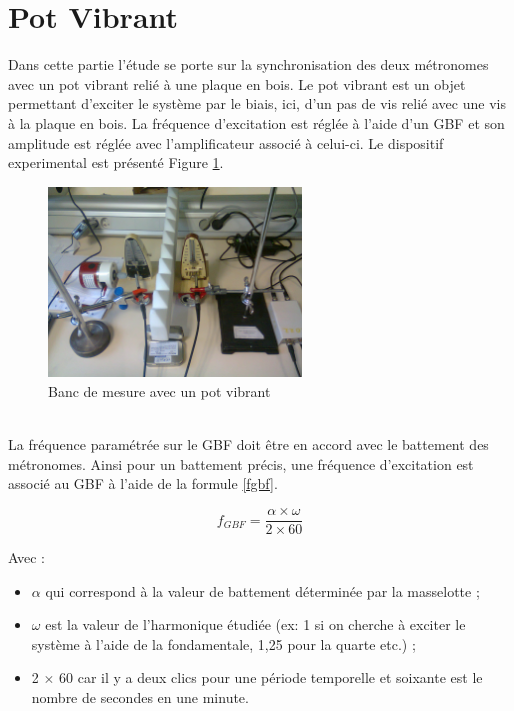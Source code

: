 \documentclass[a4paper,11pt]{report}
\begin{document}
\section{Pot Vibrant}
Dans cette partie l'étude se porte sur la synchronisation des deux métronomes avec un pot vibrant relié à une plaque en bois. Le pot vibrant est un objet permettant d'exciter le système par le biais, ici, d'un pas de vis relié avec une vis à la plaque en bois. La fréquence d'excitation est réglée à l'aide d'un GBF et son amplitude est réglée avec l'amplificateur associé à celui-ci. Le dispositif experimental est présenté Figure \ref{BancPot}.\\
\begin{figure}[h]
\centering
\includegraphics[width=0.6\textwidth]{Bancpotvibrant}
\caption{Banc de mesure avec un pot vibrant}\label{BancPot}
\end{figure}\\
La fréquence paramétrée sur le GBF doit être en accord avec le battement des métronomes. Ainsi pour un battement précis, une fréquence d'excitation est associé au GBF à l'aide de la formule \ref{fgbf}.

\begin{equation}
f_{GBF}=\frac{\alpha \times \omega}{2 \times 60}
\label{fgbf}
\end{equation}

Avec :\\
\begin{itemize}[label=\textbullet, leftmargin=* ,parsep=0cm,itemsep=0cm,topsep=0cm,font=\tiny]
\item $\alpha$ qui correspond à la valeur de battement déterminée par la masselotte ;
\item $\omega$ est la valeur de l'harmonique étudiée (ex: 1 si on cherche à exciter le système à l'aide de la fondamentale, 1,25 pour la quarte etc.) ;
\item 2 $\times$ 60 car il y a deux clics pour une période temporelle et soixante est le nombre de secondes en une minute.\\
\end{itemize}
\end{document}
